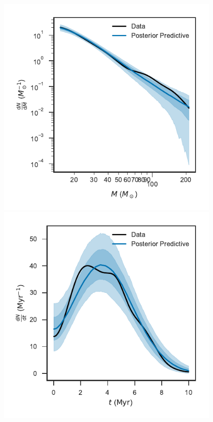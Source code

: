 \documentclass[apjl]{emulateapj}
\begin{document}
\begin{figure}
    		    		\includegraphics[width=\columnwidth]{dNdm-ppc-band.pdf}\\
                \includegraphics[width=\columnwidth]{dNdt-ppc-band.pdf}

\end{figure}
\end{document}
